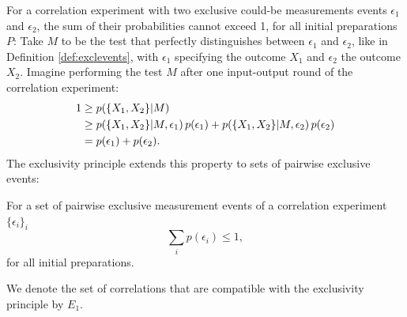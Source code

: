 For a correlation experiment with two exclusive could-be measurements events $\epsilon_1$ and $\epsilon_2$, the sum of their probabilities cannot exceed 1, for all initial preparations $P$: Take $M$ to be the test that perfectly distinguishes between $\epsilon_1$ and $\epsilon_2$, like in Definition \ref{def:exclevents}, with $\epsilon_1$ specifying the outcome $X_1$ and $\epsilon_2$ the outcome $X_2$. Imagine performing the test $M$ after one input-output round of the correlation experiment: 
\begin{align*}
1 & \geq p(\{X_1,X_2\}\vert M) \\
& \geq p(\{X_1,X_2\}\vert M, \epsilon_1)\thinspace p(\epsilon_1) + p(\{X_1,X_2\}\vert M, \epsilon_2)\thinspace p(\epsilon_2)\\
& = p(\epsilon_1)+p(\epsilon_2).
\end{align*}
The exclusivity principle extends this property to sets of pairwise exclusive events:

\begin{principle}\hfill\break
For a set of pairwise exclusive measurement events of a correlation experiment $\{\epsilon_i\}_i$
\begin{equation*}
    \sum_i p(\epsilon_i)\leq 1,
\end{equation*}
for all initial preparations.
\end{principle}

We denote the set of correlations that are compatible with the exclusivity principle by $E_1$.

